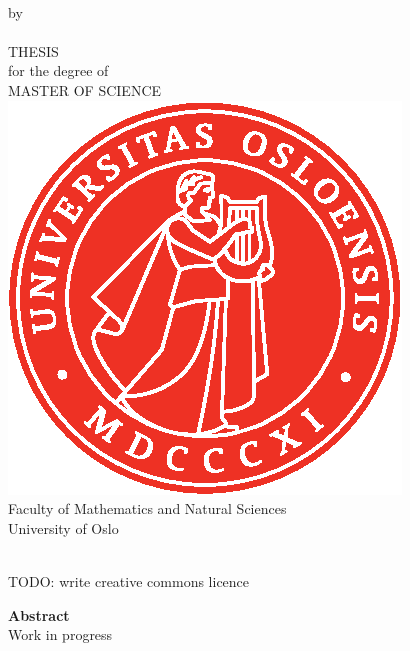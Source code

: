\thispagestyle{empty}
\begin{center} \vspace{1cm}
    \textbf{\Large{\mtitle}}\\ \vspace{0.5cm}
    \small{by}\\ \vspace{0.5cm}
    \large{\mauthor}\\ \vspace{4.4cm}
    \large{THESIS}\\ \vspace{0.3cm}
    \small{for the degree of}\\ \vspace{0.3cm}
    \large{MASTER OF SCIENCE}\\ \vspace{0.7cm}
    \includegraphics[scale=1.0]{text/UiO_Segl_pms485.eps} \\ \vspace{0.5cm}
    \large{Faculty of Mathematics and Natural Sciences \\ University of Oslo} \\ \vspace{0.5cm}
    \small{\mdate}\\ \vfill
\end{center}

\thispagestyle{empty}
\clearpage
TODO: write creative commons licence
\thispagestyle{empty}
\clearpage

\begin{center}
    \textbf{\Large{Abstract}}\\ \vspace{0.6cm}
    Work in progress
\end{center}
\thispagestyle{empty}
\clearpage

